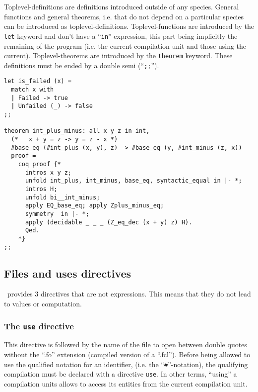 Toplevel-definitions are definitions introduced outside of any
species. General functions and general theorems, i.e. that do not
depend on a particular species can be introduced as
toplevel-definitions. Toplevel-functions are introduced by the {\tt
  let} keyword and don't have a ``{\tt in}'' expression, this part
being implicitly the remaining of the program (i.e. the current
compilation unit and those using the current).  Toplevel-theorems are
introduced by the {\tt theorem} keyword. These definitions must be ended by a double semi
(``{\tt ;;}'').  {\scriptsize
\begin{lstlisting}
let is_failed (x) =
  match x with
  | Failed -> true
  | Unfailed (_) -> false
;;

theorem int_plus_minus: all x y z in int,
  (*   x + y = z -> y = z - x *)
  #base_eq (#int_plus (x, y), z) -> #base_eq (y, #int_minus (z, x))
  proof =
    coq proof {*
      intros x y z;
      unfold int_plus, int_minus, base_eq, syntactic_equal in |- *;
      intros H;
      unfold bi__int_minus;
      apply EQ_base_eq; apply Zplus_minus_eq;
      symmetry  in |- *;
      apply (decidable _ _ _ (Z_eq_dec (x + y) z) H).
      Qed.
    *}
;;
\end{lstlisting}
}



\subsection{Files and uses directives}
\label{file directive}
\focal\ provides 3 directives that are not expressions. This means
that they do not lead to values or computation.


\subsubsection{The {\tt use} directive}
This directive is followed by the name of the file to open between
double quotes without the ``.fo'' extension (compiled version of a ``.fcl'').
Before being allowed to use the qualified notation for an identifier,
(i.e. the ``{\tt\#}''-notation), the qualifying compilation must be
declared with a directive {\tt use}. In other terms,
``using'' a compilation units allows to access its entities from the
current compilation unit.

